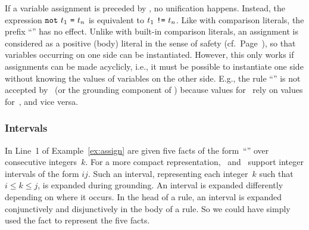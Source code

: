 \begin{note}
If a variable assignment is preceded by ,
no unification happens.
Instead, the expression $\texttt{not}~t_1~\texttt{=}~t_n$ is equivalent to $t_1~\texttt{!=}~t_n$.
Like with comparison literals, the prefix ``'' has no effect.
Unlike with built-in comparison literals,
an assignment is considered as
a positive (body) literal in the sense of safety (cf.\ Page~\pageref{pg:safe}),
so that variables occurring on one side can be instantiated.
However, this only works if assignments
can be made acyclicly, i.e.,
it must be possible to instantiate one side
without knowing the values of variables on
the other side.
E.g., the rule ``''
is not accepted by \gringo\ (or the grounding component of \clingo)
because values for~ rely on values for~, and vice versa.
%
%
\end{note}

\subsubsection{Intervals}\label{subsec:gringo:interval}

In Line~1 of Example~\ref{ex:assign}
are given five facts of the form~``''
over consecutive integers~$k$.
For a more compact representation,
\gringo\ and \clingo\ support integer intervals of the form $i$$j$.
Such an interval, representing each integer~$k$ such that $i\leq k\leq j$,
is expanded during grounding.
An interval is expanded differently depending on where it occurs.
In the head of a rule, an interval is expanded conjunctively
and disjunctively in the body of a rule.
So we could have simply used the fact  to represent the five facts.

